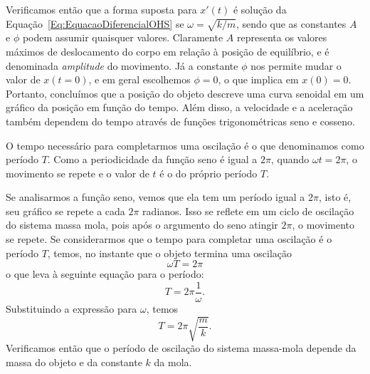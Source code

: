 Verificamos então que a forma suposta para $x'(t)$ é solução da Equação~\eqref{Eq:EquacaoDiferencialOHS} se $\omega = \sqrt{k/m}$, sendo que as constantes $A$ e $\phi$ podem assumir quaisquer valores. Claramente $A$ representa os valores máximos de deslocamento do corpo em relação à posição de equilíbrio, e é denominada \emph{amplitude} do movimento. Já a constante $\phi$ nos permite mudar o valor de $x(t=0)$, e em geral escolhemos $\phi = 0$, o que implica em $x(0) = 0$. Portanto, concluímos que a posição do objeto descreve uma curva senoidal em um gráfico da posição em função do tempo. Além disso, a velocidade e a aceleração também dependem do tempo através de funções trigonométricas seno e cosseno.
\begin{marginfigure}
\centering
{}
\caption{O tempo necessário para completarmos uma oscilação é o que denominamos como período $T$. Como a periodicidade da função seno é igual a $2\pi$, quando $\omega t = 2\pi$, o movimento se repete e o valor de $t$ é o do próprio período $T$.}
\end{marginfigure}

Se analisarmos a função seno, vemos que ela tem um período igual a $2\pi$, isto é, seu gráfico se repete a cada $2\pi$ radianos. Isso se reflete em um ciclo de oscilação do sistema massa mola, pois após o argumento do seno atingir $2\pi$, o movimento se repete. Se considerarmos que o tempo para completar uma oscilação é o período $T$, temos, no instante que o objeto termina uma oscilação
\begin{equation}
	\omega T = 2\pi
\end{equation}
%
o que leva à seguinte equação para o período:
\begin{equation}
	T = 2\pi \frac{1}{\omega}.
\end{equation}
%
Substituindo a expressão para $\omega$, temos
\begin{equation}
	T = 2\pi \sqrt{\frac{m}{k}}.
\end{equation}
%
Verificamos então que o período de oscilação do sistema massa-mola depende da massa do objeto e da constante $k$ da mola.

